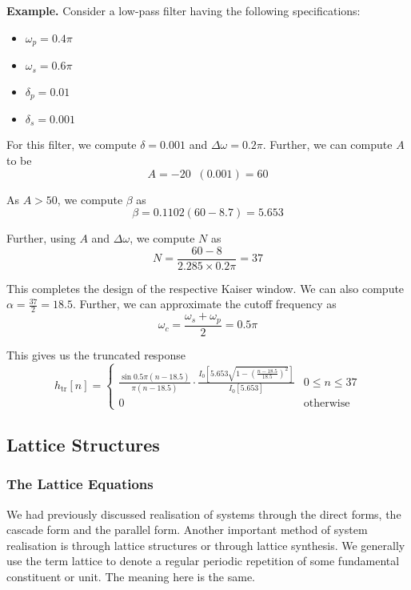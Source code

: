 \documentclass{article}
\theoremstyle{definition}
\newcommand\ddfrac[2]{\frac{\displaystyle #1}{\displaystyle #2}}
\newcommand*{\logten}{\mathop{\log_{10}}}
\begin{document}
\textbf{Example.} Consider a low-pass filter having the following specifications:
\begin{itemize}
    \item $\omega_p = 0.4 \pi$
    \item $\omega_s = 0.6 \pi$
    \item $\delta_p = 0.01$
    \item $\delta_s = 0.001$
\end{itemize}

For this filter, we compute $\delta = 0.001$ and $\Delta \omega = 0.2 \pi$. Further, we can compute $A$ to be 
\[
    A = -20 \logten (0.001) = 60
\]

As $A > 50$, we compute $\beta$ as 
\[
    \beta = 0.1102 ( 60 - 8.7 ) = 5.653 
\]

Further, using $A$ and $\Delta \omega$, we compute $N$ as 
\[
    N = \frac{60 - 8}{2.285 \times 0.2 \pi} = 37
\]

This completes the design of the respective Kaiser window. We can also compute $\alpha = \frac{37}{2} = 18.5$. Further, we can approximate the cutoff frequency as 
\[
    \omega_c = \frac{\omega_s + \omega_p}{2} = 0.5 \pi
\]

This gives us the truncated response 
\[
    h_{\text{tr}}[n] = 
    \begin{cases}
    \ddfrac{\sin 0.5 \pi (n - 18.5)}{\pi (n- 18.5)} \cdot \ddfrac{I_0 \left[ 5.653 \sqrt{ 1 - \left( \frac{n - 18.5}{18.5} \right)^2}\right]}{I_0[5.653]} & 0 \leq n \leq 37 \\
    0 & \text{otherwise}
    \end{cases}
\]

\subsection{Lattice Structures}

\subsubsection{The Lattice Equations}

We had previously discussed realisation of systems through the direct forms, the cascade form and the parallel form. Another important method of system realisation is through lattice structures or through lattice synthesis. We generally use the term lattice to denote a regular periodic repetition of some fundamental constituent or unit. The meaning here is the same. \medskip
\end{document}
